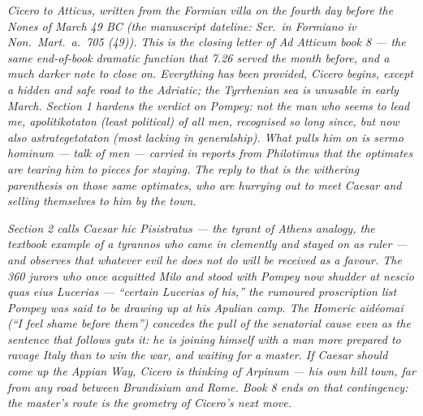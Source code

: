 
\textit{Cicero to Atticus, written from the Formian
villa on the fourth day before the Nones of March 49
BC (the manuscript dateline: \textit{Scr.\ in Formiano
iv Non.\ Mart.\ a.\ 705 (49)}). This is the closing
letter of \textit{Ad Atticum} book 8 --- the same
end-of-book dramatic function that 7.26 served the
month before, and a much darker note to close on.
Everything has been provided, Cicero begins, except a
hidden and safe road to the Adriatic; the Tyrrhenian
sea is unusable in early March. Section 1 hardens the
verdict on Pompey: not the man who seems to lead me,
\textit{apolitikotaton} (least political) of all men,
recognised so long since, but now also
\textit{astrategetotaton} (most lacking in
generalship). What pulls him on is \textit{sermo
hominum} --- talk of men --- carried in reports from
Philotimus that the \textit{optimates} are tearing him
to pieces for staying. The reply to that is the
withering parenthesis on those same \textit{optimates},
who are hurrying out to meet Caesar and selling
themselves to him by the town.}

\textit{Section 2 calls Caesar \textit{hic Pisistratus}
--- the tyrant of Athens analogy, the textbook example
of a \textit{tyrannos} who came in clemently and stayed
on as ruler --- and observes that whatever evil he does
not do will be received as a favour. The 360 jurors who
once acquitted Milo and stood with Pompey now shudder
at \textit{nescio quas eius Lucerias} --- ``certain
Lucerias of his,'' the rumoured proscription list
Pompey was said to be drawing up at his Apulian camp.
The Homeric \textit{aidéomai} (``I feel shame before
them'') concedes the pull of the senatorial cause even
as the sentence that follows guts it: he is joining
himself with a man more prepared to ravage Italy than
to win the war, and waiting for a master. If Caesar
should come up the Appian Way, Cicero is thinking of
Arpinum --- his own hill town, far from any road
between Brundisium and Rome. Book 8 ends on that
contingency: the master's route is the geometry of
Cicero's next move.}
